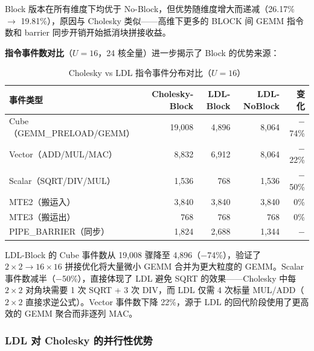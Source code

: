\documentclass{CjC}
\begin{document}
    Block 版本在所有维度下均优于 No-Block，但优势随维度增大而递减（26.17\%
    $\rightarrow$ 19.81\%），原因与 Cholesky 类似——高维下更多的 BLOCK 间 GEMM
    指令数和 barrier 同步开销开始抵消块拼接收益。

    \textbf{指令事件数对比}（$U=16$，24 核全量）进一步揭示了 Block 的优势来源：

    \begin{table}[H]
        \centering
        \caption{Cholesky vs LDL 指令事件分布对比（$U=16$）}
        \begin{tabular}{l r r r r}
            \toprule \textbf{事件类型}            & \textbf{Cholesky-Block} & \textbf{LDL-Block} & \textbf{LDL-NoBlock} & \textbf{变化} \\
            \midrule Cube（GEMM\_PRELOAD/GEMM） & 19,008                  & 4,896              & 8,064                & $-$74\%     \\
            Vector（ADD/MUL/MAC）               & 8,832                   & 6,912              & 8,064                & $-$22\%     \\
            Scalar（SQRT/DIV/MUL）              & 1,536                   & 768                & 1,536                & $-$50\%     \\
            MTE2（搬运入）                         & 3,840                   & 3,840              & 3,840                & 0\%         \\
            MTE3（搬运出）                         & 768                     & 768                & 768                  & 0\%         \\
            PIPE\_BARRIER（同步）                 & 1,824                   & 2,688              & 1,344                & $-$         \\
            \bottomrule
        \end{tabular}
    \end{table}

    LDL-Block 的 Cube 事件数从 19,008 骤降至 4,896（$-$74\%），验证了 $2\times2\rightarrow
    16\times16$ 拼接优化将大量微小 GEMM 合并为更大粒度的 GEMM。Scalar 事件数减半（$-$50\%），直接体现了
    LDL 避免 SQRT 的效果——Cholesky 中每 $2\times2$ 对角块需要 1 次 SQRT + 3 次 DIV，而
    LDL 仅需 4 次标量 MUL/ADD（$2\times2$ 直接求逆公式）。Vector 事件数下降 22\%，源于
    LDL 的回代阶段使用了更高效的 GEMM 聚合而非逐列 MAC。

    \subsubsection{LDL 对 Cholesky 的并行性优势}
\end{document}
